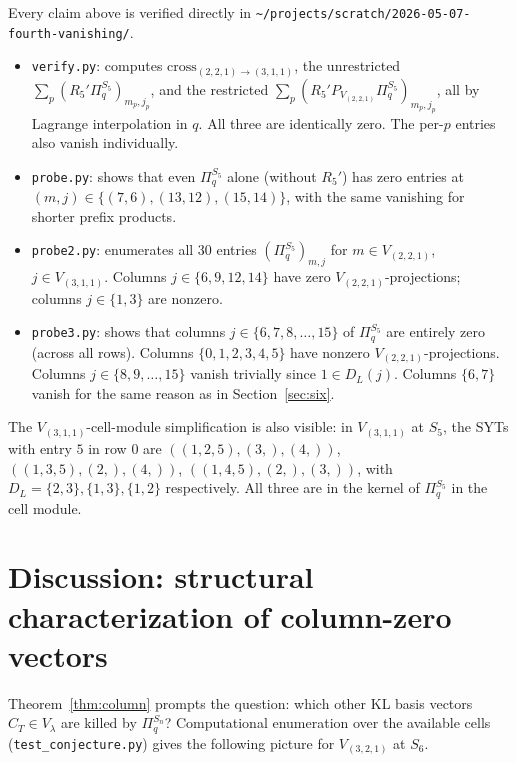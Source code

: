 \documentclass[11pt]{article}
\theoremstyle{definition}
\begin{document}
Every claim above is verified directly in \texttt{\textasciitilde/projects/scratch/2026-05-07-fourth-vanishing/}.

\begin{itemize}[leftmargin=2em,topsep=0.3em,itemsep=0.2em]
\item \texttt{verify.py}: computes $\mathrm{cross}_{(2,2,1)\to(3,1,1)}$, the unrestricted $\sum_p (R_5'\Pi_q^{S_5})_{m_p, j_p}$, and the restricted $\sum_p (R_5' P_{V_{(2,2,1)}}\Pi_q^{S_5})_{m_p, j_p}$, all by Lagrange interpolation in $q$. All three are identically zero. The per-$p$ entries also vanish individually.
\item \texttt{probe.py}: shows that even $\Pi_q^{S_5}$ alone (without $R_5'$) has zero entries at $(m, j) \in \{(7,6), (13,12), (15,14)\}$, with the same vanishing for shorter prefix products.
\item \texttt{probe2.py}: enumerates all $30$ entries $(\Pi_q^{S_5})_{m, j}$ for $m \in V_{(2,2,1)}$, $j \in V_{(3,1,1)}$. Columns $j \in \{6, 9, 12, 14\}$ have zero $V_{(2,2,1)}$-projections; columns $j \in \{1, 3\}$ are nonzero.
\item \texttt{probe3.py}: shows that columns $j \in \{6, 7, 8, \ldots, 15\}$ of $\Pi_q^{S_5}$ are entirely zero (across all rows). Columns $\{0, 1, 2, 3, 4, 5\}$ have nonzero $V_{(2,2,1)}$-projections. Columns $j \in \{8, 9, \ldots, 15\}$ vanish trivially since $1 \in D_L(j)$. Columns $\{6, 7\}$ vanish for the same reason as in Section~\ref{sec:six}.
\end{itemize}

The $V_{(3,1,1)}$-cell-module simplification is also visible: in $V_{(3,1,1)}$ at $S_5$, the SYTs with entry $5$ in row $0$ are $((1,2,5),(3,),(4,))$, $((1,3,5),(2,),(4,))$, $((1,4,5),(2,),(3,))$, with $D_L = \{2,3\}, \{1,3\}, \{1,2\}$ respectively. All three are in the kernel of $\Pi_q^{S_5}$ in the cell module.

\section{Discussion: structural characterization of column-zero vectors}\label{sec:conjectures}

Theorem~\ref{thm:column} prompts the question: which other KL basis vectors $C_T \in V_\lambda$ are killed by $\Pi_q^{S_n}$? Computational enumeration over the available cells (\texttt{test\_conjecture.py}) gives the following picture for $V_{(3,2,1)}$ at $S_6$.
\end{document}
